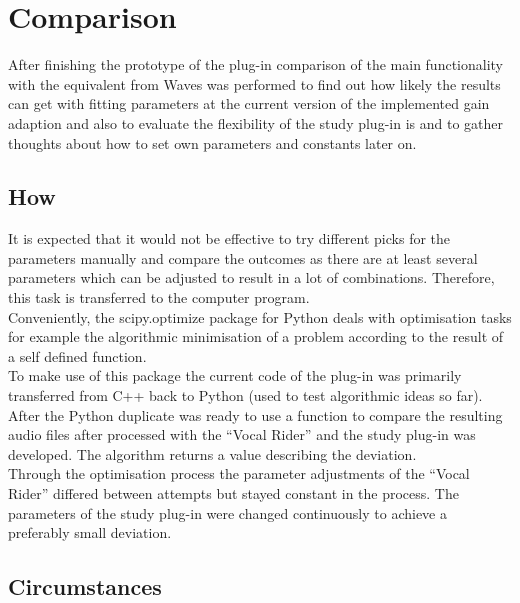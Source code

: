 \chapter{Comparison}
\label{chapter:comparison}

After finishing the prototype of the plug-in comparison of the main functionality with the equivalent from Waves was performed to find out how likely the results can get with fitting parameters at the current version of the implemented gain adaption and also to evaluate the flexibility of the study plug-in is and to gather thoughts about how to set own parameters and constants later on.\\

\section{How}

It is expected that it would not be effective to try different picks for the parameters manually and compare the outcomes as there are at least several parameters which can be adjusted to result in a lot of combinations. Therefore, this task is transferred to the computer program.\\
Conveniently, the scipy.optimize package for Python deals with optimisation tasks for example the algorithmic minimisation of a problem according to the result of a self defined function.\\
To make use of this package the current code of the plug-in was primarily transferred from C++ back to Python (used to test algorithmic ideas so far). After the Python duplicate was ready to use a function to compare the resulting audio files after processed with the “Vocal Rider” and the study plug-in was developed. The algorithm returns a value describing the deviation.\\
Through the optimisation process the parameter adjustments of the “Vocal Rider” differed between attempts but stayed constant in the process. The parameters of the study plug-in were changed continuously to achieve a preferably small deviation.\\

\section{Circumstances}

